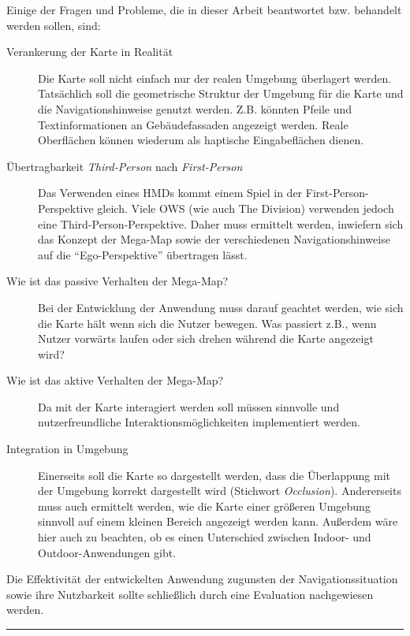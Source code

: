 \documentclass[a4paper]{scrartcl}
\begin{document}
Einige der Fragen und Probleme, die in dieser Arbeit beantwortet bzw. behandelt werden sollen, sind:
\begin{description}
\item[Verankerung der Karte in Realität]
	Die Karte soll nicht einfach nur der realen Umgebung überlagert werden.
	Tatsächlich soll die geometrische Struktur der Umgebung für die Karte und die Navigationshinweise genutzt werden.
	Z.B. könnten Pfeile und Textinformationen an Gebäudefassaden angezeigt werden.
	Reale Oberflächen können wiederum als haptische Eingabeflächen dienen.
\item[Übertragbarkeit \emph{Third-Person} nach \emph{First-Person}]
	Das Verwenden eines HMDs kommt einem Spiel in der First-Person-Perspektive gleich.
	Viele OWS (wie auch The Division) verwenden jedoch eine Third-Person-Perspektive.
	Daher muss ermittelt werden, inwiefern sich das Konzept der Mega-Map sowie der verschiedenen Navigationshinweise auf die \enquote{Ego-Perspektive} übertragen lässt.
\item[Wie ist das passive Verhalten der Mega-Map?]
	Bei der Entwicklung der Anwendung muss darauf geachtet werden, wie sich die Karte hält wenn sich die Nutzer bewegen.
	Was passiert z.B., wenn Nutzer vorwärts laufen oder sich drehen während die Karte angezeigt wird?
\item[Wie ist das aktive Verhalten der Mega-Map?]
	Da mit der Karte interagiert werden soll müssen sinnvolle und nutzerfreundliche Interaktionsmöglichkeiten implementiert werden.
\item[Integration in Umgebung]
	Einerseits soll die Karte so dargestellt werden, dass die Überlappung mit der Umgebung korrekt dargestellt wird (Stichwort \emph{Occlusion}).
	Andererseits muss auch ermittelt werden, wie die Karte einer größeren Umgebung sinnvoll auf einem kleinen Bereich angezeigt werden kann.
	Außerdem wäre hier auch zu beachten, ob es einen Unterschied zwischen Indoor- und Outdoor-Anwendungen gibt.
\end{description}

Die Effektivität der entwickelten Anwendung zugunsten der Navigationssituation sowie ihre Nutzbarkeit sollte schließlich durch eine Evaluation nachgewiesen werden.

\vspace{1em}
\hrule
\printbibliography[nottype=online]
\printbibliography[title={Online Referenzen}, type=online]
\end{document}
